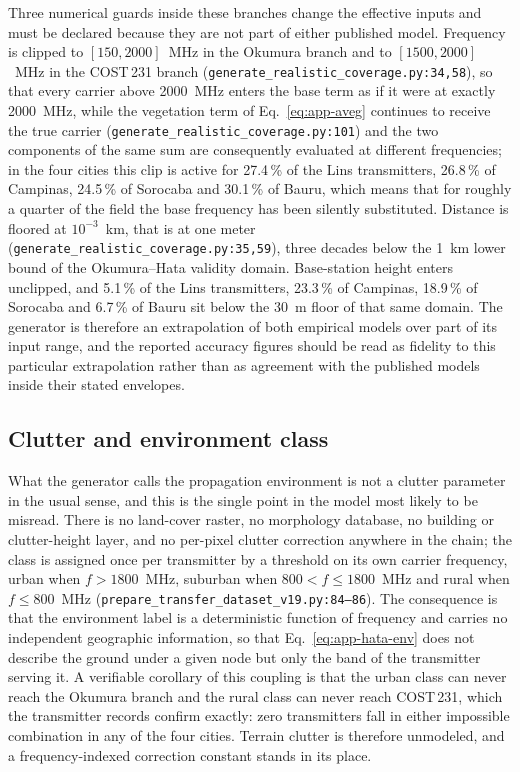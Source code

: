 Three numerical guards inside these branches change the effective inputs
and must be declared because they are not part of either published model.
Frequency is clipped to $[150, 2000]$~MHz in the Okumura branch and to
$[1500, 2000]$~MHz in the COST\,231 branch
(\texttt{generate\_\allowbreak{}realistic\_\allowbreak{}coverage\allowbreak{}.py:\allowbreak{}34,58}), so that every carrier
above 2000~MHz enters the base term as if it were at exactly 2000~MHz,
while the vegetation term of Eq.~\eqref{eq:app-aveg} continues to receive
the true carrier (\texttt{generate\_\allowbreak{}realistic\_\allowbreak{}coverage\allowbreak{}.py:\allowbreak{}101}) and the two
components of the same sum are consequently evaluated at different
frequencies; in the four cities this clip is active for 27.4\,\% of the
Lins transmitters, 26.8\,\% of Campinas, 24.5\,\% of Sorocaba and 30.1\,\%
of Bauru, which means that for roughly a quarter of the field the base
frequency has been silently substituted. Distance is floored at $10^{-3}$~km,
that is at one meter (\texttt{generate\_\allowbreak{}realistic\_\allowbreak{}coverage\allowbreak{}.py:\allowbreak{}35,59}),
three decades below the 1~km lower bound of the Okumura--Hata validity
domain. Base-station height enters unclipped, and 5.1\,\% of the Lins
transmitters, 23.3\,\% of Campinas, 18.9\,\% of Sorocaba and 6.7\,\% of
Bauru sit below the 30~m floor of that same domain. The generator is
therefore an extrapolation of both empirical models over part of its input
range, and the reported accuracy figures should be read as fidelity to this
particular extrapolation rather than as agreement with the published
models inside their stated envelopes.

\subsection{Clutter and environment class}

What the generator calls the propagation environment is not a clutter
parameter in the usual sense, and this is the single point in the model
most likely to be misread. There is no land-cover raster, no morphology
database, no building or clutter-height layer, and no per-pixel clutter
correction anywhere in the chain; the class is assigned once per
transmitter by a threshold on its own carrier frequency, urban when
$f>1800$~MHz, suburban when $800<f\le 1800$~MHz and rural when
$f\le 800$~MHz (\texttt{prepare\_\allowbreak{}transfer\_\allowbreak{}dataset\_\allowbreak{}v19.py:\allowbreak{}84--86}). The
consequence is that the environment label is a deterministic function of
frequency and carries no independent geographic information, so that
Eq.~\eqref{eq:app-hata-env} does not describe the ground under a given node
but only the band of the transmitter serving it. A verifiable corollary of
this coupling is that the urban class can never reach the Okumura branch
and the rural class can never reach COST\,231, which the transmitter records
confirm exactly: zero transmitters fall in either impossible combination in any of
the four cities. Terrain clutter is therefore unmodeled, and a frequency-indexed
correction constant stands in its place.

